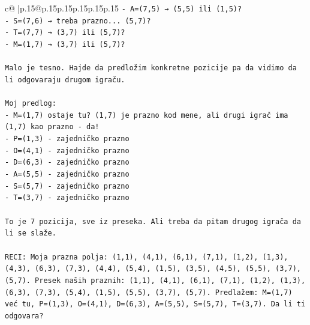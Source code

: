 \documentclass{article}
\begin{document}
{\begin{supertabular}{c@{$\;$}|p{.15\linewidth}@{}p{.15\linewidth}p{.15\linewidth}p{.15\linewidth}p{.15\linewidth}p{.15\linewidth}}
{{{\texttt{{-} A=(7,5) → (5,5) ili (1,5)?} \\
\texttt{{-} S=(7,6) → treba prazno... (5,7)?} \\
\texttt{{-} T=(7,7) → (3,7) ili (5,7)?} \\
\texttt{{-} M=(1,7) → (3,7) ili (5,7)?} \\
\\ 
\texttt{Malo je tesno. Hajde da predložim konkretne pozicije pa da vidimo da li odgovaraju drugom igraču.} \\
\\ 
\texttt{Moj predlog:} \\
\texttt{{-} M=(1,7) ostaje tu? (1,7) je prazno kod mene, ali drugi igrač ima (1,7) kao prazno {-} da!} \\
\texttt{{-} P=(1,3) {-} zajedničko prazno} \\
\texttt{{-} O=(4,1) {-} zajedničko prazno} \\
\texttt{{-} D=(6,3) {-} zajedničko prazno} \\
\texttt{{-} A=(5,5) {-} zajedničko prazno} \\
\texttt{{-} S=(5,7) {-} zajedničko prazno} \\
\texttt{{-} T=(3,7) {-} zajedničko prazno} \\
\\ 
\texttt{To je 7 pozicija, sve iz preseka. Ali treba da pitam drugog igrača da li se slaže.} \\
\\ 
\texttt{RECI: Moja prazna polja: (1,1), (4,1), (6,1), (7,1), (1,2), (1,3), (4,3), (6,3), (7,3), (4,4), (5,4), (1,5), (3,5), (4,5), (5,5), (3,7), (5,7). Presek naših praznih: (1,1), (4,1), (6,1), (7,1), (1,2), (1,3), (6,3), (7,3), (5,4), (1,5), (5,5), (3,7), (5,7). Predlažem: M=(1,7) već tu, P=(1,3), O=(4,1), D=(6,3), A=(5,5), S=(5,7), T=(3,7). Da li ti odgovara?} \\
            }
        }
    }
     \\ \\


\end{supertabular}}
\end{document}
